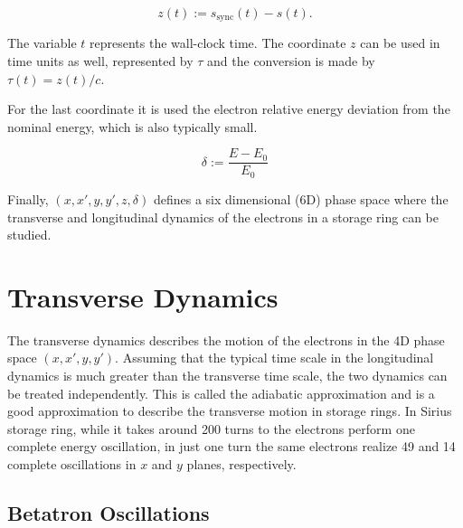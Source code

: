 \begin{equation}
    z(t) := s_{\mathrm{sync}}(t) - s(t).
\end{equation}

The variable $t$ represents the wall-clock time. The coordinate $z$ can be used in time units as well, represented by $\tau$ and the conversion is made by $\tau(t) = z(t)/c$. 

For the last coordinate it is used the electron relative energy deviation from the nominal energy, which is also typically small.

\begin{equation}
    \delta := \frac{E - E_0}{E_0}
\end{equation}

Finally, $(x, x', y, y', z, \delta)$ defines a six dimensional (6D) phase space where the transverse and longitudinal dynamics of the electrons in a storage ring can be studied.


\section{Transverse Dynamics}\label{tranverse}

The transverse dynamics describes the motion of the electrons in the 4D phase space $(x, x', y, y')$. Assuming that the typical time scale in the longitudinal dynamics is much greater than the transverse time scale, the two dynamics can be treated independently. This is called the adiabatic approximation and is a good approximation to describe the transverse motion in storage rings. In Sirius storage ring, while it takes around 200 turns to the electrons perform one complete energy oscillation, in just one turn the same electrons realize 49 and 14 complete oscillations in $x$ and $y$ planes, respectively.


\subsection{Betatron Oscillations}

